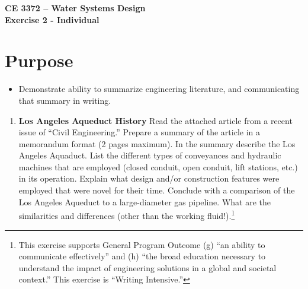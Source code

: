 \documentclass[12pt]{article}
\begin{document}
\begin{center}
{\textbf{{ CE 3372 -- Water Systems Design} \\ {Exercise 2 - Individual}}}
\end{center}
\section*{\small{Purpose}}
\begin{itemize}
\item Demonstrate ability to summarize engineering literature, and communicating that summary in writing.
\end{itemize}
\begin{enumerate}

\item{\textbf{Los Angeles Aqueduct History}}
Read the attached article from a recent issue of ``Civil Engineering.''   Prepare a summary of the article in a memorandum format (2 pages maximum).   In the summary describe the Los Angeles Aquaduct.  List the different types of conveyances and hydraulic machines that are employed (closed conduit, open conduit, lift stations, etc.) in its operation.  Explain what design and/or construction features were employed that were novel for their time.  Conclude with a comparison of the Los Angeles Aqueduct to a large-diameter gas pipeline.  What are the similarities and differences (other than the working fluid!).\footnote{This exercise supports General Program Outcome (g) ``an ability to communicate effectively'' and (h) ``the broad education necessary to understand the impact of engineering solutions in a global and societal context.''   This exercise is ``Writing Intensive.''}
\end{enumerate}

\end{document}
